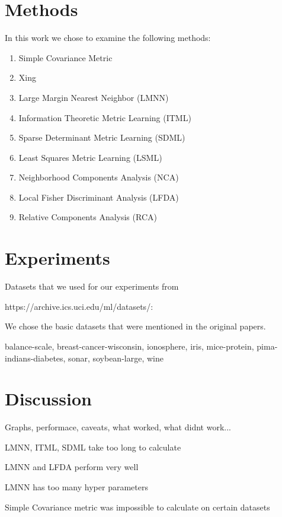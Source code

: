 \chapter{Methods}

In this work we chose to examine the following methods:

\begin{enumerate}
\item Simple Covariance Metric
\item Xing
\item Large Margin Nearest Neighbor (LMNN)
\item Information Theoretic Metric Learning (ITML)
\item Sparse Determinant Metric Learning (SDML)
\item Least Squares Metric Learning (LSML)
\item Neighborhood Components Analysis (NCA)
\item Local Fisher Discriminant Analysis (LFDA)
\item Relative Components Analysis (RCA)
\end{enumerate}

\chapter{Experiments}

Datasets that we used for our experiments from 

https://archive.ics.uci.edu/ml/datasets/:

We chose the basic datasets that were mentioned in the original papers.

balance-scale, breast-cancer-wisconsin, ionosphere, iris, mice-protein, pima-indians-diabetes, sonar, soybean-large, wine

\chapter{Discussion}

Graphs, performace, caveats, what worked, what didnt work...

LMNN, ITML, SDML take too long to calculate

LMNN and LFDA perform very well

LMNN has too many hyper parameters

Simple Covariance metric was impossible to calculate on certain datasets
